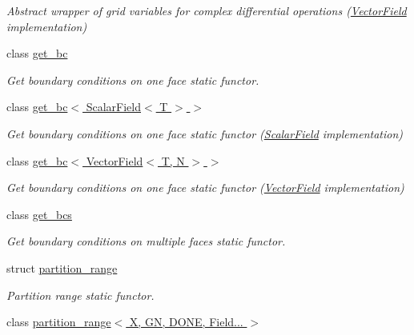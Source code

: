 \begin{DoxyCompactItemize}
\begin{DoxyCompactList}\small\item\em Abstract wrapper of grid variables for complex differential operations (\hyperlink{structUintah_1_1PhaseField_1_1VectorField}{Vector\+Field} implementation) \end{DoxyCompactList}\item 
class \hyperlink{classUintah_1_1PhaseField_1_1detail_1_1get__bc}{get\+\_\+bc}
\begin{DoxyCompactList}\small\item\em Get boundary conditions on one face static functor. \end{DoxyCompactList}\item 
class \hyperlink{classUintah_1_1PhaseField_1_1detail_1_1get__bc_3_01ScalarField_3_01T_01_4_01_4}{get\+\_\+bc$<$ Scalar\+Field$<$ T $>$ $>$}
\begin{DoxyCompactList}\small\item\em Get boundary conditions on one face static functor (\hyperlink{structUintah_1_1PhaseField_1_1ScalarField}{Scalar\+Field} implementation) \end{DoxyCompactList}\item 
class \hyperlink{classUintah_1_1PhaseField_1_1detail_1_1get__bc_3_01VectorField_3_01T_00_01N_01_4_01_4}{get\+\_\+bc$<$ Vector\+Field$<$ T, N $>$ $>$}
\begin{DoxyCompactList}\small\item\em Get boundary conditions on one face static functor (\hyperlink{structUintah_1_1PhaseField_1_1VectorField}{Vector\+Field} implementation) \end{DoxyCompactList}\item 
class \hyperlink{classUintah_1_1PhaseField_1_1detail_1_1get__bcs}{get\+\_\+bcs}
\begin{DoxyCompactList}\small\item\em Get boundary conditions on multiple faces static functor. \end{DoxyCompactList}\item 
struct \hyperlink{structUintah_1_1PhaseField_1_1detail_1_1partition__range}{partition\+\_\+range}
\begin{DoxyCompactList}\small\item\em Partition range static functor. \end{DoxyCompactList}\item 
class \hyperlink{classUintah_1_1PhaseField_1_1detail_1_1partition__range_3_01X_00_01GN_00_01DONE_00_01Field_8_8_8_01_4}{partition\+\_\+range$<$ X, G\+N, D\+O\+N\+E, Field... $>$}

\end{DoxyCompactItemize}
